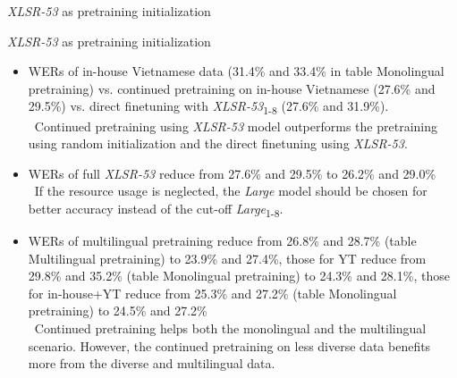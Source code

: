 \begin{frame}{\textit{XLSR-53} as pretraining initialization}
    
\end{frame}

\begin{frame}{\textit{XLSR-53} as pretraining initialization}
\begin{itemize}
    \item WERs of in-house Vietnamese data (31.4\% and 33.4\% in table Monolingual pretraining) vs. continued pretraining on in-house Vietnamese (27.6\% and 29.5\%) vs. direct finetuning with \textit{XLSR-53}\textsubscript{1-8} (27.6\% and 31.9\%).
    \\ \textrightarrow \, 
    Continued pretraining using \textit{XLSR-53} model outperforms the pretraining using random initialization and the direct finetuning using \textit{XLSR-53}.
    
    \item WERs of full \textit{XLSR-53} reduce from 27.6\% and 29.5\% to 26.2\% and 29.0\% 
    \\ \textrightarrow \,
    If the resource usage is neglected, the \textit{Large} model should be chosen for better accuracy instead of the cut-off \textit{Large}\textsubscript{1-8}. %
    
    \item WERs of multilingual pretraining reduce from 26.8\% and 28.7\% (table Multilingual pretraining) to 23.9\% and 27.4\%, those for YT reduce from 29.8\% and 35.2\% (table Monolingual pretraining) to 24.3\% and 28.1\%, those for in-house+YT reduce from 25.3\% and 27.2\% (table Monolingual pretraining) to 24.5\% and 27.2\% 
    \\ \textrightarrow \,
    Continued pretraining helps both the monolingual and the multilingual scenario. 
    However, the continued pretraining on less diverse data benefits more from the diverse and multilingual data.
\end{itemize}
\end{frame}